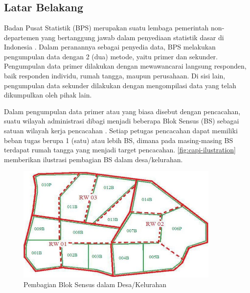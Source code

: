 \chapter{\babSatu}


\section{Latar Belakang}
Badan Pusat Statistik (BPS) merupakan suatu lembaga pemerintah non-departemen yang bertanggung jawab dalam penyediaan statistik dasar di Indonesia \citep{bps_badan_2016}. Dalam peranannya sebagai penyedia data, BPS melakukan pengumpulan data dengan 2 (dua) metode, yaitu primer dan sekunder. Pengumpulan data primer dilakukan dengan mewawancarai langsung responden, baik responden individu, rumah tangga, maupun perusahaan. Di sisi lain, pengumpulan data sekunder dilakukan dengan mengompilasi data yang telah dikumpulkan oleh pihak lain.


Dalam pengumpulan data primer atau yang biasa disebut dengan pencacahan, suatu wilayah administrasi dibagi menjadi beberapa Blok Sensus (BS) sebagai satuan wilayah kerja pencacahan \citep{bps_sistem_2016}. Setiap petugas pencacahan dapat memiliki beban tugas berupa 1 (satu) atau lebih BS, dimana pada masing-masing BS terdapat rumah tangga yang menjadi target pencacahan. \autoref{fig:capi-ilustration} memberikan ilustrasi pembagian BS dalam desa/kelurahan. 


\begin{figure}[!]
    \centering
    \includegraphics[width=10cm]{Resources/Images/peta_kelurahan_per_bs}
    \caption{Pembagian Blok Sensus dalam Desa/Kelurahan}
    \label{fig:capi-ilustration}
\end{figure}


